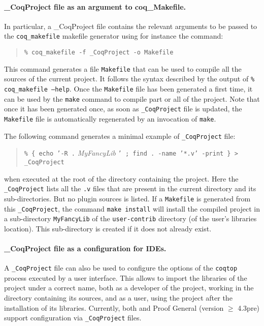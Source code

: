 \paragraph{\_CoqProject file as an argument to  coq\_Makefile.}
In particular, a \_CoqProject file contains the relevant
arguments to be passed to the \texttt{coq\_makefile} makefile
generator using for instance the command:

\begin{quotation}
\texttt{\% coq\_makefile -f \_CoqProject -o Makefile}
\end{quotation}

This command generates a file \texttt{Makefile} that can be used to
compile all the sources of the current project. It follows the
syntax described by the output of \texttt{\% coq\_makefile --help}.
Once the \texttt{Makefile} file has been generated a first time, it
can be used by the \texttt{make} command to compile part or all of
the project. Note that once it has been generated once, as soon as
\texttt{\_CoqProject} file is updated, the \texttt{Makefile} file is
automatically regenerated by an invocation of \texttt{make}.

The following command generates a minimal example of
\texttt{\_CoqProject} file:
\begin{quotation}
\texttt{\% \{ echo '-R .} \textit{MyFancyLib} \texttt{' ; find . -name
  '*.v' -print \} > \_CoqProject}
\end{quotation}
when executed at the root of the directory containing the
project. Here the \texttt{\_CoqProject} lists all the \texttt{.v} files
that are present in the current directory and its sub-directories. But no
plugin sources is listed. If a \texttt{Makefile} is generated from
this \texttt{\_CoqProject}, the command \texttt{make install} will
install the compiled project in a sub-directory \texttt{MyFancyLib} of
the \texttt{user-contrib} directory  (of the user's {\Coq} libraries
location). This sub-directory is created if it does not already exist.

\paragraph{\_CoqProject file as a configuration for IDEs.}

A \texttt{\_CoqProject} file can also be used to configure the options
of the \texttt{coqtop} process executed by a user interface. This
allows to import the libraries of the project under a correct name,
both as a developer of the project, working in the directory
containing its sources, and as a user, using the project after
the installation of its libraries. Currently, both \CoqIDE{} and Proof
General (version $\geq$ 4.3pre) support configuration via
\texttt{\_CoqProject} files.

